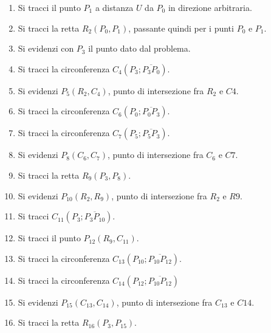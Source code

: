 \begin{enumerate}

\item Si tracci il punto $P_{1}$ a distanza $U$ da $P_{0}$ in direzione arbitraria.

\item Si tracci la retta $R_{2}(P_{0}, P_{1})$, passante quindi per i punti $P_{0}$ e $P_{1}$.

\item Si evidenzi con $P_{3}$ il punto dato dal problema.

\item Si tracci la circonferenza $C_{4}(P_{3}; \overline{P_{3} P_{0}})$.

\item Si evidenzi $P_{5}(R_{2},C_{4})$, punto di intersezione fra $R_{2}$ e $C{4}$.

\item Si tracci la circonferenza $C_{6}(P_{0}; \overline{P_{0} P_{3}})$.

\item Si tracci la circonferenza $C_{7}(P_{5}; \overline{P_{5} P_{3}})$.

\item Si evidenzi $P_{8}(C_{6},C_{7})$, punto di intersezione fra $C_{6}$ e $C{7}$.

\item Si tracci la retta $R_{9}(P_{3}, P_{8})$. 

\item Si evidenzi $P_{10}(R_{2},R_{9})$, punto di intersezione fra $R_{2}$ e $R{9}$.

\item Si tracci $C_{11}(P_{3}; \overline{P_{3} P_{10}})$.

\item Si tracci il punto $P_{12}(R_{9}, C_{11})$.

\item Si tracci la circonferenza $C_{13}(P_{10}; \overline{P_{10} P_{12}})$.

\item Si tracci la circonferenza $C_{14}(P_{12}; \overline{P_{10} P_{12}})$

\item Si evidenzi $P_{15}(C_{13},C_{14})$, punto di intersezione fra $C_{13}$ e $C{14}$.

\item Si tracci la retta $R_{16}(P_{3}, P_{15})$. 

\end{enumerate}

